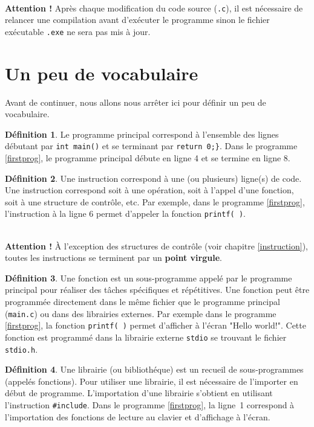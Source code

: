 \documentclass[a4paper,11pt]{book}
\newenvironment{warning} 
   {~\\ \textbf{Attention !}}{\\}
\theoremstyle{definition}
\newtheorem*{definition}{Définition}
\begin{document}
\begin{warning}
Après chaque modification du code source (\texttt{.c}), il est nécessaire de relancer une compilation avant d'exécuter le programme sinon le fichier exécutable \texttt{.exe} ne sera pas mis à jour.
\end{warning}

\section{Un peu de vocabulaire}
Avant de continuer, nous allons nous arrêter ici pour définir un peu de vocabulaire.

\begin{definition}
Le programme principal correspond à l'ensemble des lignes débutant par \texttt{int~main()} et se terminant par \texttt{return 0;\}}. Dans le programme \ref{firstprog}, le programme principal débute en ligne 4 et se termine en ligne 8.
\end{definition}

\begin{definition}
Une instruction correspond à une (ou plusieurs) ligne(s) de code. Une instruction correspond soit à une opération, soit à l'appel d'une
fonction, soit à une structure de contrôle, etc. Par exemple, dans le
programme \ref{firstprog}, l'instruction à la ligne 6 permet
d'appeler la fonction \texttt{printf(~)}.
\end{definition}
\begin{warning}
\`A l'exception des structures de contrôle (voir chapitre \ref{instruction}), toutes les instructions se terminent par un \textbf{point virgule}.
\end{warning}

\begin{definition}
Une fonction est un sous-programme appelé par le programme principal pour réaliser des tâches spécifiques et répétitives. Une fonction peut être programmée directement dans le même fichier que le programme principal (\texttt{main.c}) ou dans des librairies externes. Par exemple dans le programme \ref{firstprog}, la fonction \texttt{printf(~)} permet d'afficher à l'écran "Hello world!". Cette fonction est programmé dans la librairie externe \texttt{stdio} se trouvant le fichier \texttt{stdio.h}.
\end{definition}

\begin{definition}
Une librairie (ou bibliothéque) est un recueil de sous-programmes (appelés fonctions). Pour utiliser une librairie, il est nécessaire de l'importer en début de programme. L'importation d'une librairie s'obtient en utilisant l'instruction \texttt{\#include}. Dans le programme \ref{firstprog}, la ligne~1 correspond à l'importation des fonctions de lecture au clavier et d'affichage à l'écran.
\end{definition}
\end{document}
